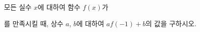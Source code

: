 모든 실수 $x$에 대하여 함수 $f(x)$가\par\smallskip{}\par\smallskip\noindent 를 만족시킬 때, 상수 $a$, $b$에 대하여 $af(-1)+b$의 값을 구하시오.
